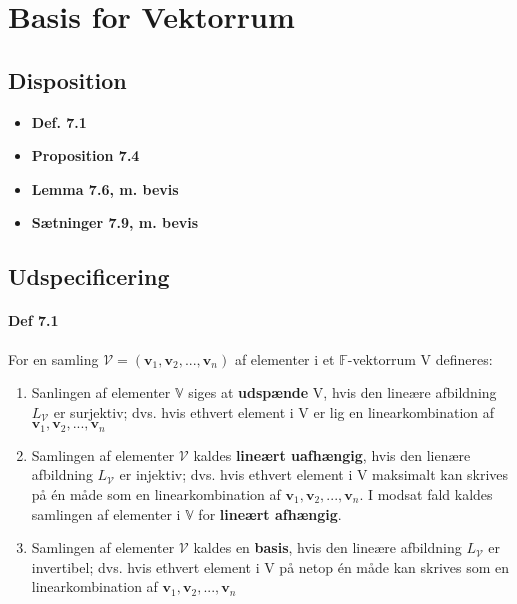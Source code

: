 \documentclass[paper=a4, fontsize=11pt]{scrartcl} %
\begin{document}
	\newpage
	
	\section{Basis for Vektorrum}
	
	\subsection{Disposition}
	
	\begin{itemize}
		\item \textbf{Def. 7.1}
		\item \textbf{Proposition 7.4}
		\item \textbf{Lemma 7.6, m. bevis}
		\item \textbf{Sætninger 7.9, m. bevis}
	\end{itemize}
	
	\subsection{Udspecificering}
	
	\paragraph{Def 7.1} For en samling $\mathcal{V}=(\mathbf{v}_1,\mathbf{v}_2,...,\mathbf{v}_n)$ af elementer i et $\mathbb{F}$-vektorrum V defineres:
	\begin{enumerate}
		\setlength\itemsep{-0.5em}
		\item Sanlingen af elementer $\mathbb{V}$ siges at \textbf{udspænde} V, hvis den lineære afbildning $L_\mathcal{V}$ er surjektiv; dvs. hvis ethvert element i V er lig en linearkombination af $\mathbf{v}_1,\mathbf{v}_2,...,\mathbf{v}_n$
		\item Samlingen af elementer $\mathcal{V}$ kaldes \textbf{lineært uafhængig}, hvis den lienære afbildning $L_\mathcal{V}$ er injektiv; dvs. hvis ethvert element i V maksimalt kan skrives på én måde som en linearkombination af $\mathbf{v}_1,\mathbf{v}_2,...,\mathbf{v}_n$. I modsat fald kaldes samlingen af elementer i $\mathbb{V}$ for \textbf{lineært afhængig}.
		\item Samlingen af elementer $\mathcal{V}$ kaldes en \textbf{basis}, hvis den lineære afbildning $L_\mathcal{V}$ er invertibel; dvs. hvis ethvert element i V på netop én måde kan skrives som en linearkombination af $\mathbf{v}_1,\mathbf{v}_2,...,\mathbf{v}_n$
	\end{enumerate}
	
\end{document}
